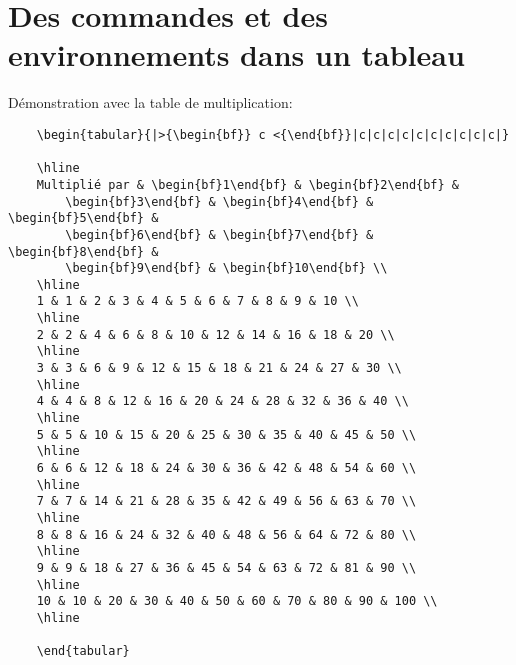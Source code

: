 \section{Des commandes et des environnements dans un tableau}
Démonstration avec la table de multiplication:
\begin{verbatim}
    \begin{tabular}{|>{\begin{bf}} c <{\end{bf}}|c|c|c|c|c|c|c|c|c|c|}
 
    \hline
    Multiplié par & \begin{bf}1\end{bf} & \begin{bf}2\end{bf} & 
    	\begin{bf}3\end{bf} & \begin{bf}4\end{bf} & \begin{bf}5\end{bf} & 
    	\begin{bf}6\end{bf} & \begin{bf}7\end{bf} & \begin{bf}8\end{bf} & 
    	\begin{bf}9\end{bf} & \begin{bf}10\end{bf} \\
    \hline
    1 & 1 & 2 & 3 & 4 & 5 & 6 & 7 & 8 & 9 & 10 \\
    \hline
    2 & 2 & 4 & 6 & 8 & 10 & 12 & 14 & 16 & 18 & 20 \\
    \hline
    3 & 3 & 6 & 9 & 12 & 15 & 18 & 21 & 24 & 27 & 30 \\
    \hline
    4 & 4 & 8 & 12 & 16 & 20 & 24 & 28 & 32 & 36 & 40 \\
    \hline
    5 & 5 & 10 & 15 & 20 & 25 & 30 & 35 & 40 & 45 & 50 \\
    \hline
    6 & 6 & 12 & 18 & 24 & 30 & 36 & 42 & 48 & 54 & 60 \\
    \hline
    7 & 7 & 14 & 21 & 28 & 35 & 42 & 49 & 56 & 63 & 70 \\
    \hline
    8 & 8 & 16 & 24 & 32 & 40 & 48 & 56 & 64 & 72 & 80 \\
    \hline
    9 & 9 & 18 & 27 & 36 & 45 & 54 & 63 & 72 & 81 & 90 \\
    \hline
    10 & 10 & 20 & 30 & 40 & 50 & 60 & 70 & 80 & 90 & 100 \\
    \hline
 
    \end{tabular}
\end{verbatim}
\medskip

